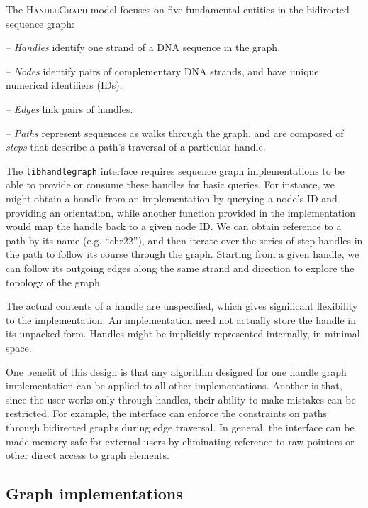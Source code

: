 \documentclass{article}
\begin{document}
The \textsc{HandleGraph} model focuses on five fundamental entities in the bidirected sequence graph:

-- \emph{Handles} identify one strand of a DNA sequence in the graph.

-- \emph{Nodes} identify pairs of complementary DNA strands, and have unique numerical identifiers (IDs).

-- \emph{Edges} link pairs of handles.

-- \emph{Paths} represent sequences as walks through the graph, and are composed of \emph{steps} that describe a path's traversal of a particular handle.


The \texttt{libhandlegraph} interface requires sequence graph implementations to be able to provide or consume these handles for basic queries.
For instance, we might obtain a handle from an implementation by querying a node's ID and providing an orientation, while another function provided in the implementation would map the handle back to a given node ID.
We can obtain reference to a path by its name (e.g. ``chr22''), and then iterate over the series of step handles in the path to follow its course through the graph.
Starting from a given handle, we can follow its outgoing edges along the same strand and direction to explore the topology of the graph.

The actual contents of a handle are unspecified, which gives significant flexibility to the implementation.
An implementation need not actually store the handle in its unpacked form.
Handles might be implicitly represented internally, in minimal space.

One benefit of this design is that any algorithm designed for one handle graph implementation can be applied to all other implementations.
Another is that, since the user works only through handles, their ability to make mistakes can be restricted.
For example, the interface can enforce the constraints on paths through bidirected graphs during edge traversal.
In general, the interface can be made memory safe for external users by eliminating reference to raw pointers or other direct access to graph elements.


\subsection{Graph implementations}
\end{document}
